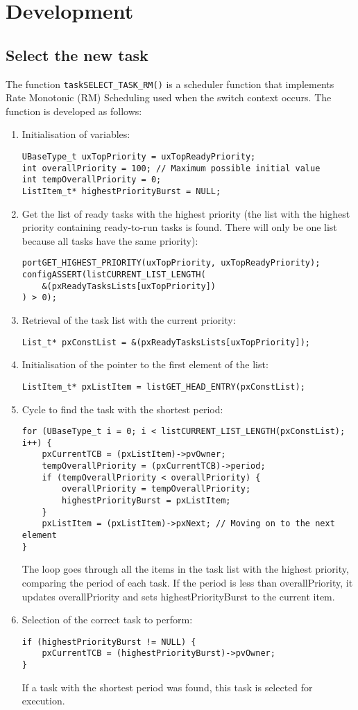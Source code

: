\section{Development}
\subsection{Select the new task} \label{sec:2.1}
The function \texttt{taskSELECT\_TASK\_RM()} is a scheduler function that implements Rate Monotonic (RM) Scheduling used when the switch context occurs. The function is developed as follows:
\begin{enumerate}
\item Initialisation of variables:
\begin{lstlisting}
UBaseType_t uxTopPriority = uxTopReadyPriority;
int overallPriority = 100; // Maximum possible initial value
int tempOverallPriority = 0;
ListItem_t* highestPriorityBurst = NULL;
\end{lstlisting}
\item Get the list of ready tasks with the highest priority (the list with the highest priority containing ready-to-run tasks is found. There will only be one list because all tasks have the same priority):
\begin{lstlisting}
portGET_HIGHEST_PRIORITY(uxTopPriority, uxTopReadyPriority);
configASSERT(listCURRENT_LIST_LENGTH(
    &(pxReadyTasksLists[uxTopPriority])
) > 0);
\end{lstlisting}
\item Retrieval of the task list with the current priority:
\begin{lstlisting}
List_t* pxConstList = &(pxReadyTasksLists[uxTopPriority]);
\end{lstlisting}
\item Initialisation of the pointer to the first element of the list:
\begin{lstlisting}
ListItem_t* pxListItem = listGET_HEAD_ENTRY(pxConstList);   
\end{lstlisting}
\item Cycle to find the task with the shortest period:
\begin{lstlisting}
for (UBaseType_t i = 0; i < listCURRENT_LIST_LENGTH(pxConstList); i++) {
    pxCurrentTCB = (pxListItem)->pvOwner;
    tempOverallPriority = (pxCurrentTCB)->period;
    if (tempOverallPriority < overallPriority) {
        overallPriority = tempOverallPriority;
        highestPriorityBurst = pxListItem;
    }
    pxListItem = (pxListItem)->pxNext; // Moving on to the next element
}
\end{lstlisting}
The loop goes through all the items in the task list with the highest priority, comparing the period of each task. If the period is less than overallPriority, it updates overallPriority and sets highestPriorityBurst to the current item.
\item Selection of the correct task to perform:
\begin{lstlisting}
if (highestPriorityBurst != NULL) {
    pxCurrentTCB = (highestPriorityBurst)->pvOwner;
}
\end{lstlisting}
If a task with the shortest period was found, this task is selected for execution.
\end{enumerate}

